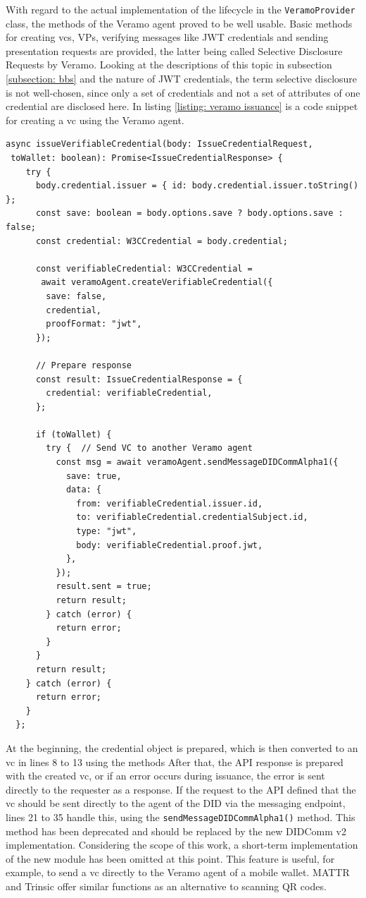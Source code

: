     With regard to the actual implementation of the lifecycle in the \texttt{VeramoProvider} class, the methods of the Veramo agent proved to be well usable. Basic methods for creating \acp{vc}, \acp{VP}, verifying messages like JWT credentials and sending presentation requests are provided, the latter being called Selective Disclosure Requests by Veramo. Looking at the descriptions of this topic in subsection \ref{subsection: bbs} and the nature of JWT credentials, the term selective disclosure is not well-chosen, since only a set of credentials and not a set of attributes of one credential are disclosed here. In listing \ref{listing: veramo issuance} is a code snippet for creating a \ac{vc} using the Veramo agent.
    \newline
        \begin{lstlisting}[style=ES6, caption=Issue a \ac{vc} with Veramo, label={listing: veramo issuance}]
async issueVerifiableCredential(body: IssueCredentialRequest, 
 toWallet: boolean): Promise<IssueCredentialResponse> {
    try {
      body.credential.issuer = { id: body.credential.issuer.toString() };
      const save: boolean = body.options.save ? body.options.save : false;
      const credential: W3CCredential = body.credential;
      
      const verifiableCredential: W3CCredential = 
       await veramoAgent.createVerifiableCredential({
        save: false,
        credential,
        proofFormat: "jwt",
      });

      // Prepare response
      const result: IssueCredentialResponse = {
        credential: verifiableCredential,
      };

      if (toWallet) {
        try {  // Send VC to another Veramo agent
          const msg = await veramoAgent.sendMessageDIDCommAlpha1({
            save: true,
            data: {
              from: verifiableCredential.issuer.id,
              to: verifiableCredential.credentialSubject.id,
              type: "jwt",
              body: verifiableCredential.proof.jwt,
            },
          });
          result.sent = true;
          return result;
        } catch (error) {
          return error;
        }
      }
      return result;
    } catch (error) {
      return error;
    }
  };\end{lstlisting}
    
        At the beginning, the credential object is prepared, which is then converted to an \ac{vc} in lines 8 to 13 using the methods After that, the API response is prepared with the created \ac{vc}, or if an error occurs during issuance, the error is sent directly to the requester as a response. If the request to the API defined that the \ac{vc} should be sent directly to the agent of the DID via the messaging endpoint, lines 21 to 35 handle this, using the \texttt{sendMessageDIDCommAlpha1()} method. This method has been deprecated and should be replaced by the new DIDComm v2 implementation. Considering the scope of this work, a short-term implementation of the new module has been omitted at this point. This feature is useful, for example, to send a \ac{vc} directly to the Veramo agent of a mobile wallet. MATTR and Trinsic offer similar functions as an alternative to scanning QR codes.
    
